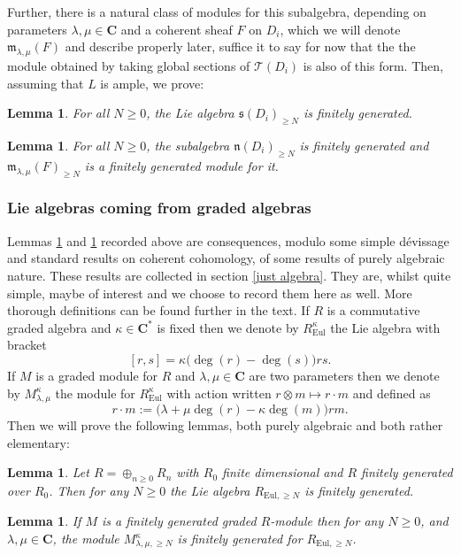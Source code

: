 \documentclass[12pt, oneside]{amsart}       %
\newtheorem{lemma}[theorem]{Lemma}
\theoremstyle{remark}
\renewcommand{\ge}{\geqslant}
\renewcommand{\geq}{\geqslant}
\begin{document}
Further, there is a natural class of modules for this subalgebra, depending on parameters $\lambda,\mu\in\mathbf C$ and a coherent sheaf $F$ on $D_i$, which we will denote $\mathfrak{m}_{\lambda,\mu}(F)$ and describe properly later, suffice it to say for now that the the module obtained by taking global sections of $\mathcal{T}(D_i)$ is also of this form. Then, assuming that $L$ is ample, we prove:

\begin{lemma}\label{symb finite (intro)} For all $N\geq0$, the Lie algebra $\mathfrak{s}(D_i)_{\geq N}$ is finitely generated. \end{lemma}
\begin{lemma}\label{eul mod fin gen (intro)} For all $N\geq0$, the subalgebra $\mathfrak{n}(D_i)_{\geq N}$ is finitely generated and $\mathfrak{m}_{\lambda,\mu}(F)_{\geq N}$ is a finitely generated module for it.\end{lemma}



\subsubsection{Lie algebras coming from graded algebras}\label{euler intro} Lemmas \ref{symb finite (intro)} and \ref{eul mod fin gen (intro)} recorded above are consequences, modulo some simple d\'{e}vissage and standard results on coherent cohomology, of some results of purely algebraic nature. These results are collected in section \ref{just algebra}. They are, whilst quite simple, maybe of interest and we choose to record them here as well. More thorough definitions can be found further in the text. If $R$ is a commutative graded algebra and $\kappa\in\mathbf C^*$ is fixed then we denote by $R_{\mathrm{Eul}}^\kappa$ the Lie algebra with bracket $$[r,s]=\kappa\big(\deg(r)-\deg(s)\big)rs.$$  If $M$ is a graded module for $R$ and $\lambda,\mu\in\mathbf C$ are two parameters then we denote by $M^\kappa_{\lambda,\mu}$ the module for $R_{\mathrm{Eul}}^\kappa$ with action written $r\otimes m\mapsto r\cdot m$ and defined as$$r\cdot m:=\big(\lambda+\mu\deg(r)-\kappa\deg(m)\big)rm.$$ Then we will prove the following lemmas, both purely algebraic and both rather elementary:\begin{lemma} Let $R=\oplus_{n\geq 0} R_n$ with $R_0$ finite dimensional and $R$ finitely generated over $R_0$. Then for any $N\ge 0$ the Lie algebra $R_{\mathrm{Eul},\geq N}$ is finitely generated. \end{lemma} \begin{lemma} If $M$ is a finitely generated graded $R$-module then for any $N\geq0$, and $\lambda,\mu\in\mathbf C$, the module $M^\kappa_{\lambda,\mu,\geq N}$ is finitely generated for $R_{\mathrm{Eul},\geq N}$. \end{lemma}
\end{document}
